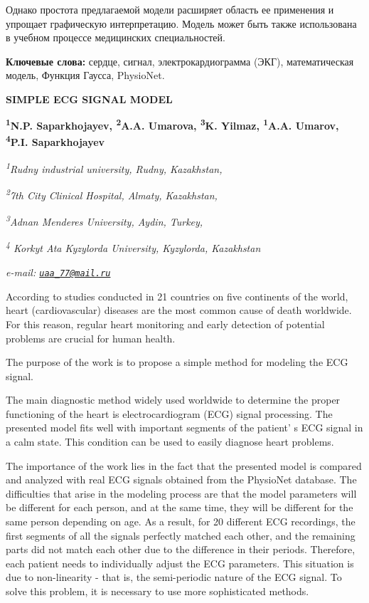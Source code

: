 Однако простота предлагаемой модели расширяет область ее применения и
упрощает графическую интерпретацию. Модель может быть также использована
в учебном процессе медицинских специальностей.

{\bfseries Ключевые слова:} сердце, сигнал, электрокардиограмма (ЭКГ),
математическая модель, Функция Гаусса, PhysioNet.

\begin{articleheader}
{\bfseries SIMPLE ECG SIGNAL MODEL}

{\bfseries
\textsuperscript{1}N.P. Saparkhojayev,
\textsuperscript{2}A.A. Umarova,
\textsuperscript{3}K. Yilmaz,
\textsuperscript{1}A.A. Umarov,
\textsuperscript{4}P.I. Saparkhojayev}
\end{articleheader}

\begin{affiliation}
\emph{\textsuperscript{1}Rudny industrial university, Rudny, Kazakhstan,}

\emph{\textsuperscript{2}7th City Clinical Hospital, Almaty, Kazakhstan,}

\emph{\textsuperscript{3}Adnan Menderes University, Aydin, Turkey,}

\emph{\textsuperscript{4} Korkyt Ata Kyzylorda University, Kyzylorda, Kazakhstan}

\emph{e-mail: \href{mailto:uaa_77@mail.ru}{\nolinkurl{uaa\_77@mail.ru}}}
\end{affiliation}

According to studies conducted in 21 countries on five continents of the
world, heart (cardiovascular) diseases are the most common cause of
death worldwide. For this reason, regular heart monitoring and early
detection of potential problems are crucial for human health.

The purpose of the work is to propose a simple method for modeling the
ECG signal.

The main diagnostic method widely used worldwide to determine the proper
functioning of the heart is electrocardiogram (ECG) signal processing.
The presented model fits well with important segments of the
patient' s ECG signal in a calm state. This condition can
be used to easily diagnose heart problems.

The importance of the work lies in the fact that the presented model is
compared and analyzed with real ECG signals obtained from the PhysioNet
database. The difficulties that arise in the modeling process are that
the model parameters will be different for each person, and at the same
time, they will be different for the same person depending on age. As a
result, for 20 different ECG recordings, the first segments of all the
signals perfectly matched each other, and the remaining parts did not
match each other due to the difference in their periods. Therefore, each
patient needs to individually adjust the ECG parameters. This situation
is due to non-linearity - that is, the semi-periodic nature of the ECG
signal. To solve this problem, it is necessary to use more sophisticated
methods.

